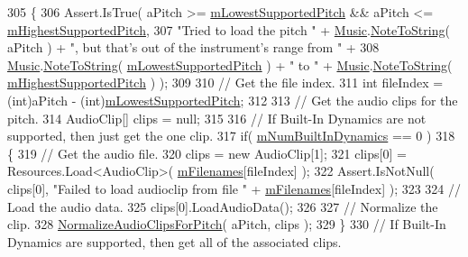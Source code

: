 \begin{DoxyCode}
305     \{
306         Assert.IsTrue( aPitch >= \hyperlink{group___v_i_base_pro_var_ga3cae52b1bcc0178a8a6b03c7aaf7aac8}{mLowestSupportedPitch} && aPitch <= 
      \hyperlink{group___v_i_base_pro_var_ga61fb2c33b53a0f663047779d7ceb18f3}{mHighestSupportedPitch},
307             \textcolor{stringliteral}{"Tried to load the pitch "} + \hyperlink{class_music}{Music}.\hyperlink{group___music_stat_func_ga85a22c905d56d4c5f4e62159bfecee8c}{NoteToString}( aPitch ) + \textcolor{stringliteral}{", but that's out
       of the instrument's range from "} +
308             \hyperlink{class_music}{Music}.\hyperlink{group___music_stat_func_ga85a22c905d56d4c5f4e62159bfecee8c}{NoteToString}( \hyperlink{group___v_i_base_pro_var_ga3cae52b1bcc0178a8a6b03c7aaf7aac8}{mLowestSupportedPitch} ) + \textcolor{stringliteral}{" to "} + 
      \hyperlink{class_music}{Music}.\hyperlink{group___music_stat_func_ga85a22c905d56d4c5f4e62159bfecee8c}{NoteToString}( \hyperlink{group___v_i_base_pro_var_ga61fb2c33b53a0f663047779d7ceb18f3}{mHighestSupportedPitch} ) );
309 
310         \textcolor{comment}{// Get the file index.}
311         \textcolor{keywordtype}{int} fileIndex = (int)aPitch - (\textcolor{keywordtype}{int})\hyperlink{group___v_i_base_pro_var_ga3cae52b1bcc0178a8a6b03c7aaf7aac8}{mLowestSupportedPitch};
312         
313         \textcolor{comment}{// Get the audio clips for the pitch.}
314         AudioClip[] clips = null;
315 
316         \textcolor{comment}{// If Built-In Dynamics are not supported, then just get the one clip.}
317         \textcolor{keywordflow}{if}( \hyperlink{group___v_i_base_pro_var_gac265f64f759d267ee1e1680f8d387011}{mNumBuiltInDynamics} == 0 )
318         \{
319             \textcolor{comment}{// Get the audio file.}
320             clips = \textcolor{keyword}{new} AudioClip[1];
321             clips[0] = Resources.Load<AudioClip>( \hyperlink{group___v_i_base_pro_var_gab2add474ca506357688b5dd08cac4cb5}{mFilenames}[fileIndex] );
322             Assert.IsNotNull( clips[0], \textcolor{stringliteral}{"Failed to load audioclip from file "} + 
      \hyperlink{group___v_i_base_pro_var_gab2add474ca506357688b5dd08cac4cb5}{mFilenames}[fileIndex] );
323 
324             \textcolor{comment}{// Load the audio data.}
325             clips[0].LoadAudioData();
326 
327             \textcolor{comment}{// Normalize the clip.}
328             \hyperlink{group___v_i_base_priv_func_gaecd4f9ead08a03be878b2085055a975c}{NormalizeAudioClipsForPitch}( aPitch, clips );
329         \}
330         \textcolor{comment}{// If Built-In Dynamics are supported, then get all of the associated clips.}

\end{DoxyCode}
